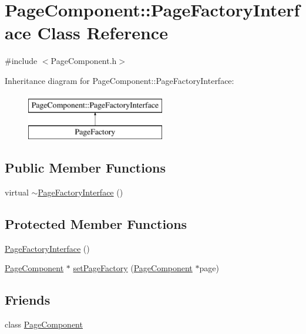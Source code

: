 \hypertarget{classPageComponent_1_1PageFactoryInterface}{}\section{Page\+Component\+:\+:Page\+Factory\+Interface Class Reference}
\label{classPageComponent_1_1PageFactoryInterface}


{\ttfamily \#include $<$Page\+Component.\+h$>$}

Inheritance diagram for Page\+Component\+:\+:Page\+Factory\+Interface\+:\begin{figure}[H]
\begin{center}
\leavevmode
\includegraphics[height=2.000000cm]{classPageComponent_1_1PageFactoryInterface}
\end{center}
\end{figure}
\subsection*{Public Member Functions}
\begin{DoxyCompactItemize}
\item 
virtual \mbox{\hyperlink{classPageComponent_1_1PageFactoryInterface_a9ee056a5a0fe76215c38312f03fb9514}{$\sim$\+Page\+Factory\+Interface}} ()
\end{DoxyCompactItemize}
\subsection*{Protected Member Functions}
\begin{DoxyCompactItemize}
\item 
\mbox{\hyperlink{classPageComponent_1_1PageFactoryInterface_a2ac3c4c1c22a71468a9238dd5941cde0}{Page\+Factory\+Interface}} ()
\item 
\mbox{\hyperlink{classPageComponent}{Page\+Component}} $\ast$ \mbox{\hyperlink{classPageComponent_1_1PageFactoryInterface_a6e32640cdfb7e12b0c7172d74195de56}{set\+Page\+Factory}} (\mbox{\hyperlink{classPageComponent}{Page\+Component}} $\ast$page)
\end{DoxyCompactItemize}
\subsection*{Friends}
\begin{DoxyCompactItemize}
\item 
class \mbox{\hyperlink{classPageComponent_1_1PageFactoryInterface_ad38036d55f115286c52feb1c6fcf3b39}{Page\+Component}}
\end{DoxyCompactItemize}


